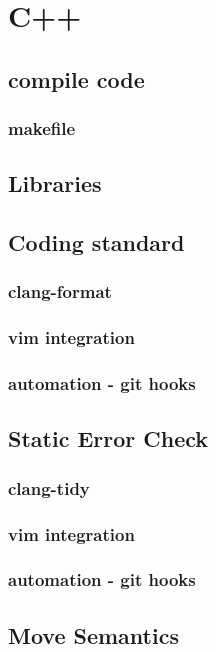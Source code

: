 \chapter{C++}

\section{compile code} 

\subsection{makefile} 

\section{Libraries} 

\section{Coding standard} 
\subsection{clang-format}
\subsection{vim integration}
\subsection{automation - git hooks}


\section{Static Error Check} 
\subsection{clang-tidy}
\subsection{vim integration}
\subsection{automation - git hooks}

\section{Move Semantics} 

